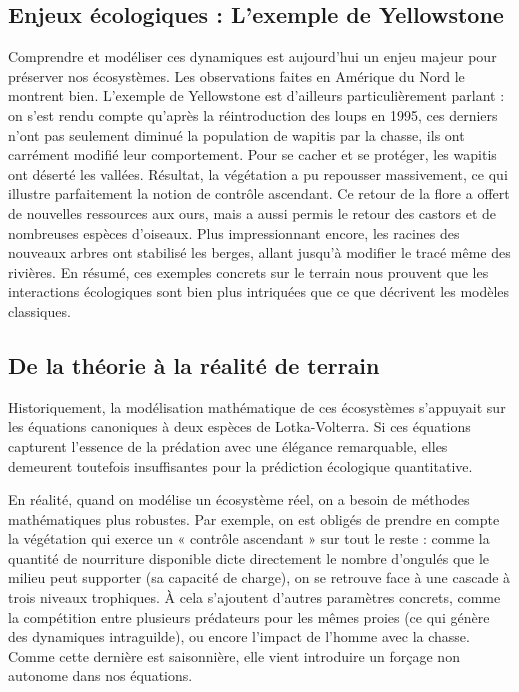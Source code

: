 \documentclass[12pt,a4paper]{article}
\begin{document}
\subsection{Enjeux écologiques : L'exemple de Yellowstone}
Comprendre et modéliser ces dynamiques est aujourd'hui un enjeu majeur pour préserver nos écosystèmes. Les observations faites en Amérique du Nord le montrent bien. L'exemple de Yellowstone est d'ailleurs particulièrement parlant : on s'est rendu compte qu'après la réintroduction des loups en 1995, ces derniers n'ont pas seulement diminué la population de wapitis par la chasse, ils ont carrément modifié leur comportement. Pour se cacher et se protéger, les wapitis ont déserté les vallées. Résultat, la végétation a pu repousser massivement, ce qui illustre parfaitement la notion de contrôle ascendant. Ce retour de la flore a offert de nouvelles ressources aux ours, mais a aussi permis le retour des castors et de nombreuses espèces d'oiseaux. Plus impressionnant encore, les racines des nouveaux arbres ont stabilisé les berges, allant jusqu'à modifier le tracé même des rivières. En résumé, ces exemples concrets sur le terrain nous prouvent que les interactions écologiques sont bien plus intriquées que ce que décrivent les modèles classiques.

\subsection{De la théorie à la réalité de terrain}
Historiquement, la modélisation mathématique de ces écosystèmes s'appuyait sur les équations canoniques à deux espèces de Lotka-Volterra. Si ces équations capturent l'essence de la prédation avec une élégance remarquable, elles demeurent toutefois insuffisantes pour la prédiction écologique quantitative. 

En réalité, quand on modélise un écosystème réel, on a besoin de méthodes mathématiques plus robustes. Par exemple, on est obligés de prendre en compte la végétation qui exerce un « contrôle ascendant » sur tout le reste : comme la quantité de nourriture disponible dicte directement le nombre d'ongulés que le milieu peut supporter (sa capacité de charge), on se retrouve face à une cascade à trois niveaux trophiques. À cela s'ajoutent d'autres paramètres concrets, comme la compétition entre plusieurs prédateurs pour les mêmes proies (ce qui génère des dynamiques intraguilde), ou encore l'impact de l'homme avec la chasse. Comme cette dernière est saisonnière, elle vient introduire un forçage non autonome dans nos équations. 
\end{document}
